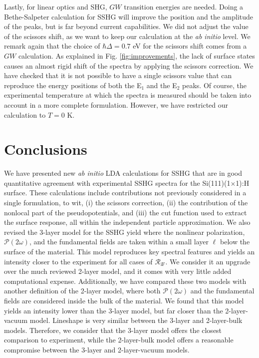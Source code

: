 \documentclass[prb,superscriptaddress,showpacs,twocolumn,letterpaper]{revtex4}
\begin{document}
Lastly, for linear optics and SHG, $GW$ transition energies are needed. Doing a
Bethe-Salpeter calculation for SSHG will improve the position and the amplitude
of the peaks, but is far beyond current capabilities.\cite{puff} We did not
adjust the value of the scissors shift, as we want to keep our calculation at
the {\em ab initio} level. We remark again that the choice of $\hbar\Delta=0.7$
eV for the scissors shift comes from a $GW$ calculation.\cite{liPRB10} As
explained in Fig. \ref{fig:improvements}, the lack of surface states causes an
almost rigid shift of the spectra by applying the scissors correction. We have
checked that it is not possible to have a single scissors value that can
reproduce the energy positions of both the E$_{1}$ and the E$_{2}$ peaks. Of
course, the experimental temperature at which the spectra is measured should be
taken into account in a more complete formulation. However, we have restricted
our calculation to $T=0$ K.


\section{Conclusions}\label{sec:conclusions}

We have presented new \emph{ab initio} LDA calculations for SSHG that are in
good quantitative agreement with experimental SSHG spectra for the
Si(111)(1$\times$1):H surface. These calculations include contributions not
previously considered in a single formulation, to wit, (i) the scissors
correction, (ii) the contribution of the nonlocal part of the pseudopotentials,
and (iii) the cut function used to extract the surface response, all within the
independent particle approximation. We also revised the 3-layer model for the
SSHG yield where the nonlinear polarization,
$\boldsymbol{\mathcal{P}}(2\omega)$, and the fundamental fields are taken within
a small layer $\ell$ below the surface of the material. This model reproduces
key spectral features and yields an intensity closer to the experiment for all
cases of $\mathcal{R}_{\mathrm{iF}}$. We consider it an upgrade over the much
reviewed 2-layer model\cite{mizrahiJOSA88}, and it comes with very little added
computational expense. Additionally, we have compared these two models with
another definition of the 2-layer model, where both
$\boldsymbol{\mathcal{P}}(2\omega)$ and the fundamental fields are considered
inside the bulk of the material. We found that this model yields an intensity
lower than the 3-layer model, but far closer than the 2-layer-vacuum model.
Lineshape is very similar between the 3-layer and 2-layer-bulk models.
Therefore, we consider that the 3-layer model offers the closest comparison to
experiment, while the 2-layer-bulk model offers a reasonable compromise between
the 3-layer and 2-layer-vacuum models.
\end{document}
